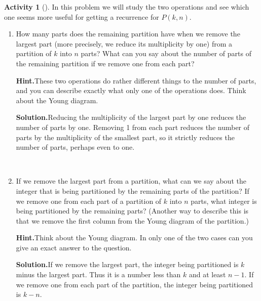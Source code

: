 \documentclass[10pt,]{book}
\theoremstyle{plain}
\theoremstyle{definition}
\newtheorem{activity}[project]{Activity}
\numberwithin{equation}{chapter}
\begin{document}
\begin{activity}[]\label{numberpartitionrecurrence}
In this problem we will study the two operations and see which one seems more useful for getting a recurrence for \(P(k,n)\).%
~\par
\begin{enumerate}[label=(\alph*)]
 \item How many parts does the remaining partition have when we remove the largest part (more precisely, we reduce its multiplicity by one) from a partition of \(k\) into \(n\) parts?  What can you say about the number of parts of the remaining partition if we remove one from each part?%
\par\medskip\noindent%
\textbf{Hint.}\quad These two operations do rather different things to the number of parts, and you can describe exactly what only one of the operations does. Think about the Young diagram.%
\par\medskip\noindent%
\textbf{Solution.}\quad Reducing the multiplicity of the largest part by one reduces the number of parts by one. Removing 1 from each part reduces the number of parts by the multiplicity of the smallest part, so it strictly reduces the number of parts, perhaps even to one.%

~\par
\item If we remove the largest part from a partition, what can we say about the integer that is being partitioned by the remaining parts of the partition? If we remove one from each part of a partition of \(k\) into \(n\) parts, what integer is being partitioned by the remaining parts? (Another way to describe this is that we remove the first column from the Young diagram of the partition.)%
\par\medskip\noindent%
\textbf{Hint.}\quad Think about the Young diagram. In only one of the two cases can you give an exact answer to the question.%
\par\medskip\noindent%
\textbf{Solution.}\quad If we remove the largest part, the integer being partitioned is \(k\) minus the largest part. Thus it is a number less than \(k\) and at least \(n-1\). If we remove one from each part of the partition, the integer being partitioned is \(k-n\).%


\end{enumerate}
\end{activity}
\end{document}
